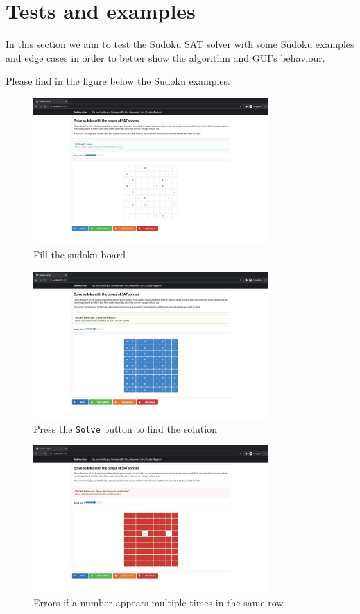 \documentclass[]{usiinfprospectus}
\newcounter{row}
\begin{document}
\newpage

\section{Tests and examples}\label{trials}

In this section we aim to test the Sudoku SAT solver with some Sudoku examples
and edge cases in order to better show the algorithm and GUI's behaviour.

Please
find in the figure below the Sudoku examples.

\begin{figure}[ht]
\centering
\includegraphics[width=0.8\textwidth]{pics/fill_board.png}
\caption{Fill the sudoku board}
\end{figure}

\begin{figure}[ht]
\centering
\includegraphics[width=0.8\textwidth]{pics/solved.png}
\caption{Press the \texttt{Solve} button to find the solution}
\end{figure}

\begin{figure}[ht]
\centering
\includegraphics[width=0.8\textwidth]{pics/row_check.png}
\caption{Errors if a number appears multiple times in the same row}
\end{figure}
\end{document}
